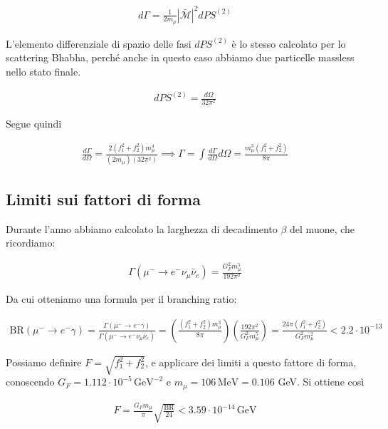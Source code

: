 \documentclass[11pt]{report}
\begin{document}
\begin{align}
    d\Gamma = \frac{1}{2m_\mu}|\mathcal{\bar{M}}|^2dPS^{(2)}
\end{align}

L'elemento differenziale di spazio delle fasi \(dPS^{(2)}\) è lo stesso calcolato per lo scattering Bhabha, perché anche in questo caso abbiamo due particelle massless nello stato finale. 

\begin{align}
    dPS^{(2)} = \frac{d\Omega}{32\pi^2}
\end{align}

Segue quindi 

\begin{align}
    \frac{d\Gamma}{d\Omega} = \frac{2(f_1^2+f_2^2)m_\mu^4}{(2m_\mu)(32\pi^2)} \implies \Gamma = \int \frac{d\Gamma}{d\Omega}d\Omega = \frac{m^3_\mu (f_1^2+f_2^2)}{8\pi}
\end{align}

\subsection{Limiti sui fattori di forma}

Durante l'anno abbiamo calcolato la larghezza di decadimento \(\beta\) del muone, che ricordiamo: 

\begin{align}
    \Gamma(\mu^- \to e^- \nu_\mu \bar{\nu}_e) = \frac{G_F^2 m^5_\mu}{192\pi^2}
\end{align}

Da cui otteniamo una formula per il branching ratio: 

\begin{align}
    \text{BR}(\mu^-\to e^-\gamma) = \frac{\Gamma(\mu^-\to e^-\gamma)}{\Gamma(\mu^- \to e^- \nu_\mu \bar{\nu}_e)} = \left(\frac{(f_1^2+f_2^2)m_\mu^3}{8\pi} \right)\left(\frac{192\pi^2}{G_F^2 m_\mu ^5} \right) = \frac{24\pi (f_1^2+f_2^2)}{G_F^2 m_\mu^2} < 2.2 \cdot 10^{-13}
\end{align}

Possiamo definire \(F = \sqrt{f_1^2+f_2^2}\), e applicare dei limiti a questo fattore di forma, conoscendo \(G_F = 1.112 \cdot 10^{-5} \, \text{GeV}^{-2}\) e \(m_\mu = 106 \, \text{MeV} = 0.106\) GeV. Si ottiene così 

\begin{align}
    F = \frac{G_F m_\mu}{\pi}\sqrt{\frac{\text{BR}}{24}} < 3.59 \cdot 10^{-14} \, \text{GeV} 
\end{align}
\end{document}
